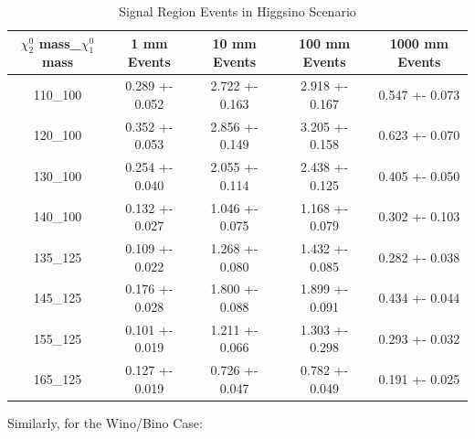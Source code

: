 \documentclass{article}
\begin{document}
\begin{table}[H]
        \centering
        \begin{tabular}{||c|c|c|c|c||}
        \hline
        {$\chi_{2}^{0}$ mass}\_{$\chi_{1}^{0}$ mass} & 1 mm Events & 10 mm Events & 100 mm Events & 1000 mm Events \\
        \hline
        110\_100	& 0.289 +- 0.052 & 2.722 +- 0.163 & 2.918 +- 0.167 & 0.547 +- 0.073 \\
        120\_100	& 0.352 +- 0.053 & 2.856 +- 0.149 & 3.205 +- 0.158 & 0.623 +- 0.070 \\
        130\_100	& 0.254 +- 0.040 & 2.055 +- 0.114 & 2.438 +- 0.125 & 0.405 +- 0.050 \\
        140\_100	& 0.132 +- 0.027 & 1.046 +- 0.075 & 1.168 +- 0.079 & 0.302 +- 0.103 \\
        \hline
        \hline
        135\_125 & 0.109 +- 0.022 & 1.268 +- 0.080 & 1.432 +- 0.085 & 0.282 +- 0.038 \\
        145\_125	& 0.176 +- 0.028 & 1.800 +- 0.088	& 1.899 +- 0.091 & 0.434 +- 0.044 \\
        155\_125	& 0.101 +- 0.019 & 1.211 +- 0.066 & 1.303 +- 0.298 & 0.293 +- 0.032 \\
        165\_125	& 0.127 +- 0.019 & 0.726 +- 0.047 & 0.782 +- 0.049 & 0.191 +- 0.025 \\
        \hline
        \end{tabular}
        \caption{Signal Region Events in Higgsino Scenario}
        \label{table:5}
\end{table}
\par
Similarly, for the Wino/Bino Case:
\end{document}
